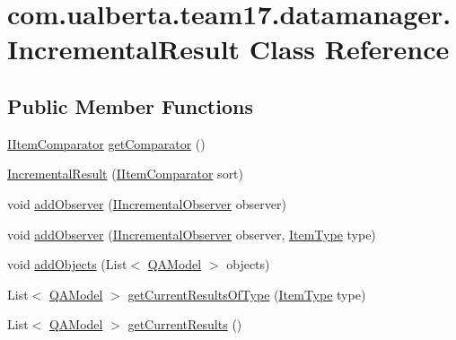 \hypertarget{classcom_1_1ualberta_1_1team17_1_1datamanager_1_1_incremental_result}{\section{com.\+ualberta.\+team17.\+datamanager.\+Incremental\+Result Class Reference}
\label{classcom_1_1ualberta_1_1team17_1_1datamanager_1_1_incremental_result}
}
\subsection*{Public Member Functions}
\begin{DoxyCompactItemize}
\item 
\hyperlink{interfacecom_1_1ualberta_1_1team17_1_1datamanager_1_1_i_item_comparator}{I\+Item\+Comparator} \hyperlink{classcom_1_1ualberta_1_1team17_1_1datamanager_1_1_incremental_result_a73d16d75d3e57080dc4ca83525175906}{get\+Comparator} ()
\item 
\hyperlink{classcom_1_1ualberta_1_1team17_1_1datamanager_1_1_incremental_result_a11ca05c0fb2605742eee10772b5f4535}{Incremental\+Result} (\hyperlink{interfacecom_1_1ualberta_1_1team17_1_1datamanager_1_1_i_item_comparator}{I\+Item\+Comparator} sort)
\item 
void \hyperlink{classcom_1_1ualberta_1_1team17_1_1datamanager_1_1_incremental_result_a20d252ee8145bbf9b2589dc8d4592f8f}{add\+Observer} (\hyperlink{interfacecom_1_1ualberta_1_1team17_1_1datamanager_1_1_i_incremental_observer}{I\+Incremental\+Observer} observer)
\item 
void \hyperlink{classcom_1_1ualberta_1_1team17_1_1datamanager_1_1_incremental_result_a3ada133e416beceb7c31934650d8719a}{add\+Observer} (\hyperlink{interfacecom_1_1ualberta_1_1team17_1_1datamanager_1_1_i_incremental_observer}{I\+Incremental\+Observer} observer, \hyperlink{enumcom_1_1ualberta_1_1team17_1_1_item_type}{Item\+Type} type)
\item 
void \hyperlink{classcom_1_1ualberta_1_1team17_1_1datamanager_1_1_incremental_result_a247fc35515e27829740623b8f09cad16}{add\+Objects} (List$<$ \hyperlink{classcom_1_1ualberta_1_1team17_1_1_q_a_model}{Q\+A\+Model} $>$ objects)
\item 
List$<$ \hyperlink{classcom_1_1ualberta_1_1team17_1_1_q_a_model}{Q\+A\+Model} $>$ \hyperlink{classcom_1_1ualberta_1_1team17_1_1datamanager_1_1_incremental_result_a0bdaf908d6f11cb51736a2e6ed054fe1}{get\+Current\+Results\+Of\+Type} (\hyperlink{enumcom_1_1ualberta_1_1team17_1_1_item_type}{Item\+Type} type)
\item 
List$<$ \hyperlink{classcom_1_1ualberta_1_1team17_1_1_q_a_model}{Q\+A\+Model} $>$ \hyperlink{classcom_1_1ualberta_1_1team17_1_1datamanager_1_1_incremental_result_a7e902c453fe5d9f806451c4c0054df64}{get\+Current\+Results} ()
\end{DoxyCompactItemize}



